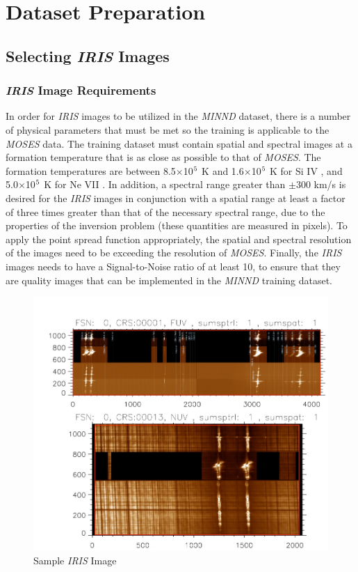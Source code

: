 \documentclass[10pt,a4paper,titlepage]{article}
\begin{document}
	\section{Dataset Preparation}
			\subsection{Selecting \textit{IRIS} Images}
				\label{IRIS Image}
			\subsubsection{\textit{IRIS} Image Requirements}
			
					In order for \textit{IRIS} images to be utilized in the \textit{MINND} dataset, there is a number of physical parameters that must be met so the training is applicable to the \textit{MOSES} data. The training dataset must contain spatial and spectral images at a formation temperature that is as close as possible to that of \textit{MOSES}. The formation temperatures are between 8.5$\times$10$\textsuperscript{5}$ K and 1.6$\times$10$\textsuperscript{5}$ K for Si IV \cite{1538-4357-477-2-L119}, and 5.0$\times$10$\textsuperscript{5}$ K for Ne VII \cite{bray2005plasma}. In addition, a spectral range greater than $\pm$300 km/s is desired for the \textit{IRIS} images in conjunction with a spatial range at least a factor of three times greater than that of the necessary spectral range, due to the properties of the inversion problem (these quantities are measured in pixels). To apply the point spread function appropriately, the spatial and spectral resolution of the images need to be exceeding the resolution of \textit{MOSES}. Finally, the \textit{IRIS} images needs to have a Signal-to-Noise ratio of at least 10, to ensure that they are quality images that can be implemented in the \textit{MINND} training dataset. 
								 
					\begin{figure}[H]
						\includegraphics[scale=0.46]{IRISsample}
						\centering
						\caption{Sample \textit{IRIS} Image}
						\centering
					\end{figure}
\end{document}
